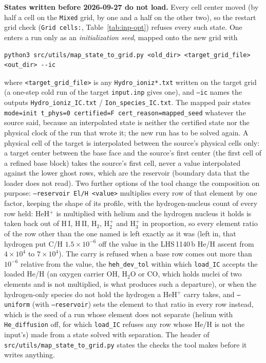 \documentclass[english,a4paper]{my_memo}
\begin{document}
\textbf{States written before 2026-09-27 do not load.} Every cell center moved
(by half a cell on the \texttt{Mixed} grid, by one and a half on the other
two), so the restart grid check (\texttt{Grid cells:},
Table~\ref{tab:inp-opt}) refuses every such state. One enters a run only as an
\emph{initialization seed}, mapped onto the new grid with
\begin{lstlisting}[style=sh]
python3 src/utils/map_state_to_grid.py <old_dir> <target_grid_file> <out_dir> --ic
\end{lstlisting}
where \texttt{<target\_grid\_file>} is any \texttt{Hydro\_ioniz*.txt} written
on the target grid (a one-step cold run of the target \texttt{input.inp}
gives one), and \texttt{--ic} names the outputs
\texttt{Hydro\_ioniz\_IC.txt} / \texttt{Ion\_species\_IC.txt}. The mapped pair
states \texttt{mode=init t\_phys=0 certified=F cert\_reason=mapped\_seed}
whatever the source said, because an interpolated state is neither the
certified state nor the physical clock of the run that wrote it; the new run
has to be solved again. A physical cell of the target is interpolated between
the source's physical cells only: a target center between the base face and
the source's first center (the first cell of a refined base block) takes the
source's first cell, never a value interpolated against the lower ghost rows,
which are the reservoir (boundary data that the loader does not read). Two further options of the tool change the
composition on purpose: \texttt{--reservoir El/H <value>} multiplies every
row of that element by one factor, keeping the shape of its profile, with
the hydrogen-nucleus count of every row held: HeH$^+$ is multiplied with
helium and the hydrogen nucleus it holds is taken back out of H\,I, H\,II,
H$_2$, H$_2^+$ and H$_3^+$ in proportion, so every element ratio of the row
other than the one named is left exactly as it was (left in, that hydrogen
put C/H $1.5\times10^{-6}$ off the value in the LHS\,1140\,b He/H ascent
from $4\times10^4$ to $7\times10^4$). The carry is refused when a base row
comes out more than $10^{-6}$ relative from the value, the
\texttt{heh\_dev\_tol} within which \texttt{load\_IC} accepts the loaded
He/H (an oxygen carrier OH, H$_2$O or CO, which holds nuclei of two elements
and is not multiplied, is what produces such a departure), or when the
hydrogen-only species do not hold the hydrogen a HeH$^+$ carry takes, and
\texttt{--uniform} (with \texttt{--reservoir}) sets the element to that ratio
in every row instead, which is the seed of a run whose element does not
separate (helium with \texttt{He\_diffusion} off, for which \texttt{load\_IC}
refuses any row whose He/H is not the input's) made from a state solved with
separation. The header of \texttt{src/utils/map\_state\_to\_grid.py} states
the checks the tool makes before it writes anything.
\end{document}
